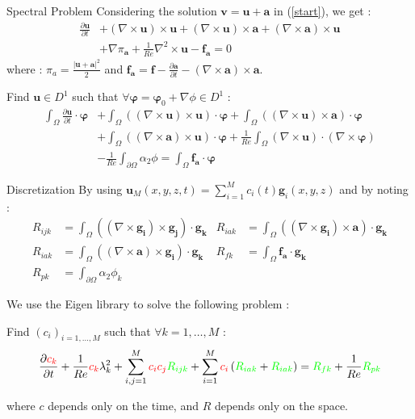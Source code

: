 \documentclass{beamer}
\newcommand{\grad}{{\nabla}}
\newcommand{\curl}{{\nabla\times}}
\newcommand{\curll}{{\nabla^2\times}}
\begin{document}
\begin{frame}{Spectral Problem}
  Considering the solution $\mathbf{v}=\mathbf{u}+\mathbf{a}$ in (\ref{start}), we get :
  \begin{align*}
    \frac{\partial \mathbf{u}}{\partial t} &+ (\curl \mathbf{u})\times \mathbf{u} + (\curl \mathbf{u})\times \mathbf{a} + \left(\curl \mathbf{a}\right)\times \mathbf{u} \\
    &+ \grad\pi_\mathbf{a} + \frac{1}{Re}\curll \mathbf{u} - \mathbf{f_a} = 0
  \end{align*}
  where : $\pi_a=\frac{|\mathbf{u}+\mathbf{a}|^2}{2}$ and $\mathbf{f_a}=\mathbf{f}-\frac{\partial \mathbf{a}}{\partial t}-(\curl\mathbf{a})\times\mathbf{a}$.
  \begin{block}{Find $\mathbf{u}\in D^1$ such that $\forall \bm{\varphi}=\bm{\varphi}_0+\grad\phi\in D^1$ :}
    \begin{align*}
      \int_\Omega \frac{\partial \mathbf{u}}{\partial t}\cdot \bm{\varphi} &+ \int_\Omega ((\curl \mathbf{u})\times \mathbf{u})\cdot \bm{\varphi} + \int_\Omega ((\curl \mathbf{u})\times \mathbf{a})\cdot\bm{\varphi} \\
      &+ \int_\Omega ((\curl \mathbf{a})\times \mathbf{u})\cdot\bm{\varphi} + \frac{1}{Re}\int_\Omega (\curl \mathbf{u})\cdot(\curl\bm{\varphi}) \\
      &-\frac{1}{Re}\int_{\partial\Omega} \alpha_2\phi = \int_\Omega \mathbf{f_a}\cdot\bm{\varphi}
    \end{align*}
  \end{block}
\end{frame}

\begin{frame}{Discretization}
  By using $\mathbf{u}_M(x,y,z,t)=\sum_{i=1}^M c_i(t)\mathbf{g}_i(x,y,z)$ and by noting :
  \begin{align*}
    R_{ijk} &= \int_\Omega((\curl\mathbf{g_i})\times \mathbf{g_j})\cdot\mathbf{g_k} & R_{iak} &= \int_\Omega((\curl\mathbf{g_i})\times \mathbf{a})\cdot\mathbf{g_k}\\
    R_{iak} &= \int_\Omega((\curl\mathbf{a})\times \mathbf{g_i})\cdot\mathbf{g_k} & R_{fk} &= \int_\Omega\mathbf{f_a}\cdot\mathbf{g_k}\\
    R_{pk} &= \int_{\partial\Omega} \alpha_2\phi_k
  \end{align*}

  We use the Eigen library to solve the following problem :
  \begin{block}{Find $(c_i)_{i=1,\dots,M}$ such that $\forall k=1,\dots,M$ :}
    \[ \frac{\partial {\color{red}c_k}}{\partial t} + \frac{1}{Re}{\color{red}c_k}\lambda_k^2 + \sum_{i,j=1}^M{\color{red}c_ic_j}{\color{green}R_{ijk}} + \sum_{i=1}^M{\color{red}c_i}\left({\color{green}R_{iak}} + {\color{green}R_{iak}}\right) = {\color{green}R_{fk}} + \frac{1}{Re}{\color{green}R_{pk}} \]
  \end{block}
  where {\color{red} $c$} depends only on the time, and {\color{green} $R$} depends only on the space.
\end{frame}
\end{document}
